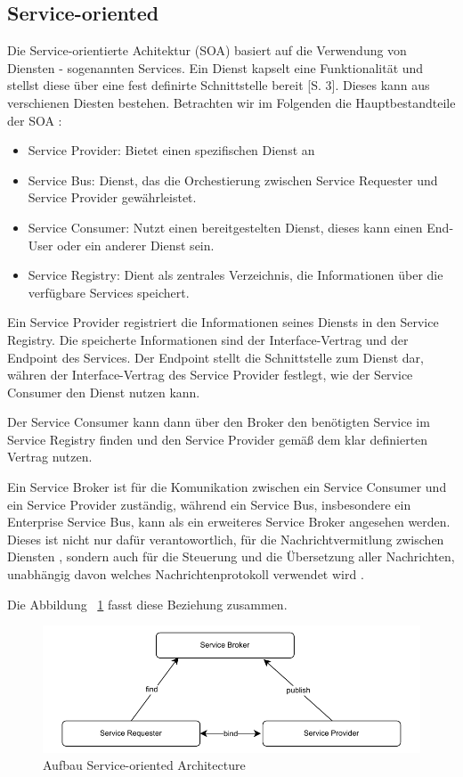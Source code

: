 \documentclass[acmtog]{acmart}
\begin{document}
\subsection{Service-oriented}
Die Service-orientierte Achitektur (SOA) basiert auf die Verwendung von Diensten
- sogenannten Services. 
Ein Dienst kapselt eine Funktionalität und stellst diese über eine
 fest definirte Schnittstelle bereit \cite{soa2}[S. 3].
Dieses kann aus verschienen Diesten bestehen.
 Betrachten wir im Folgenden die Hauptbestandteile der SOA \cite{soa4}:
\begin{itemize}
  \item Service Provider: Bietet einen spezifischen Dienst an
  \item Service Bus: Dienst, das die Orchestierung zwischen Service Requester und Service Provider gewährleistet.
  \item Service Consumer: Nutzt einen bereitgestelten Dienst, dieses kann einen End-User oder ein anderer Dienst sein.
  \item Service Registry: Dient als zentrales Verzeichnis, die Informationen über die verfügbare Services speichert.
\end{itemize}

Ein Service Provider registriert die Informationen seines Diensts in den Service Registry.
 Die speicherte Informationen sind der Interface-Vertrag und der Endpoint des Services. 
Der Endpoint stellt die Schnittstelle zum Dienst dar, währen der Interface-Vertrag des 
Service Provider festlegt, wie der Service Consumer den Dienst nutzen kann.

Der Service Consumer kann dann über den Broker den benötigten Service im Service 
Registry finden und den Service Provider gemäß dem klar definierten Vertrag nutzen.

Ein Service Broker ist für die Komunikation zwischen ein Service Consumer und ein 
Service Provider zuständig, während ein Service Bus, insbesondere ein Enterprise 
Service Bus, kann als ein erweiteres Service Broker angesehen werden. Dieses ist nicht nur dafür verantowortlich, für die
 Nachrichtvermitlung zwischen Diensten , sondern auch für die Steuerung und die 
 Übersetzung aller Nachrichten, unabhängig davon welches Nachrichtenprotokoll verwendet wird \cite{soa4}.

Die Abbildung ~\ref{fig:soa} fasst diese Beziehung zusammen.
\begin{figure}[h]
  \centering
  \includegraphics[width=0.85\linewidth]{images/soa/soa.pdf}
  \caption{Aufbau Service-oriented Architecture}
  \label{fig:soa}
\end{figure}
\end{document}
